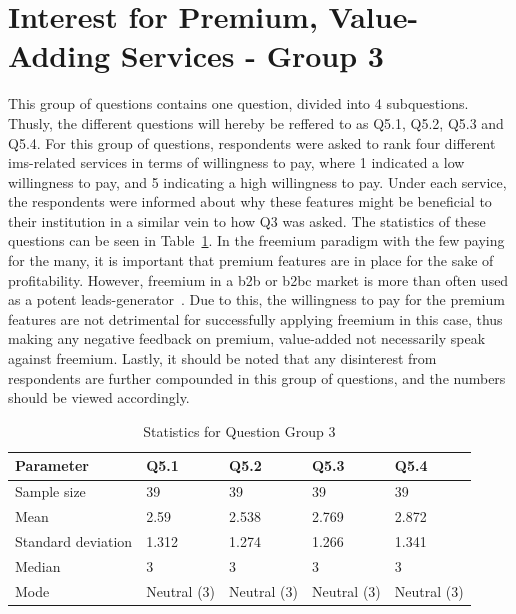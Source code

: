 \section{Interest for Premium, Value-Adding Services - Group 3}
This group of questions contains one question, divided into 4 subquestions. Thusly, the different questions will hereby be reffered to as Q5.1, Q5.2, Q5.3 and Q5.4. For this group of questions, respondents were asked to rank four different \gls{ims}-related services in terms of willingness to pay, where 1 indicated a low willingness to pay, and 5 indicating a high willingness to pay. Under each service, the respondents were informed about why these features might be beneficial to their institution in a similar vein to how Q3 was asked. The statistics of these questions can be seen in Table~\ref{q5stats}. In the freemium paradigm with the few paying for the many, it is important that premium features are in place for the sake of profitability. However, freemium in a \gls{b2b} or \gls{b2bc} market is more than often used as a potent leads-generator~\cite{jepson2009freemium}. Due to this, the willingness to pay for the premium features are not detrimental for successfully applying freemium in this case, thus making any negative feedback on premium, value-added not necessarily speak against freemium. Lastly, it should be noted that any disinterest from respondents are further compounded in this group of questions, and the numbers should be viewed accordingly.

\begin{table}[]
\centering
\caption{Statistics for Question Group 3}
\label{q5stats}
\begin{tabular}{|l|l|l|l|l|}
\hline
\textbf{Parameter} & \textbf{Q5.1} & \textbf{Q5.2} & \textbf{Q5.3} & \textbf{Q5.4} \\ \hline
Sample size        & 39            & 39            & 39            & 39            \\ \hline
Mean               & 2.59          & 2.538         & 2.769         & 2.872         \\ \hline
Standard deviation & 1.312         & 1.274         & 1.266         & 1.341         \\ \hline
Median             & 3             & 3             & 3             & 3             \\ \hline
Mode               & Neutral (3)   & Neutral (3)   & Neutral (3)   & Neutral (3)   \\ \hline
\end{tabular}
\end{table}


